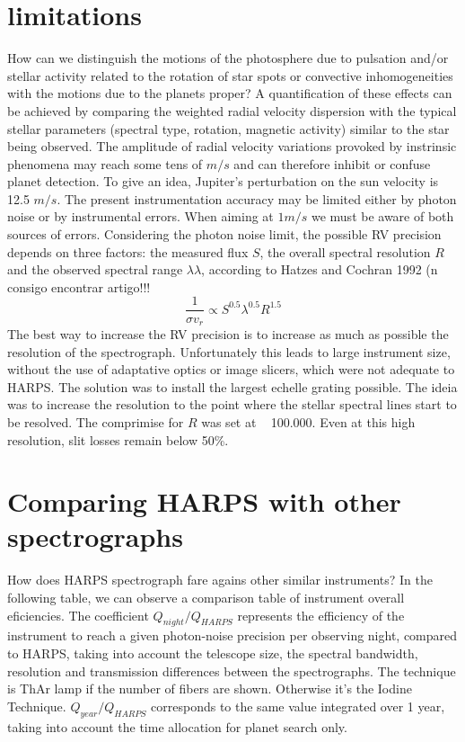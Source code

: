 \documentclass[dvips,12pt,a4paper]{report}
\begin{document}
{{\section{limitations}

How can we distinguish the motions of the photosphere due to pulsation and/or stellar activity related to the rotation of star spots or convective inhomogeneities with the motions due to the planets proper? A quantification of these effects can be achieved by comparing the weighted radial velocity dispersion with the typical stellar parameters (spectral type, rotation, magnetic activity) similar to the star being observed. The amplitude of radial velocity variations provoked by instrinsic phenomena may reach some tens of $m/s$ and can therefore inhibit or confuse planet detection. To give an idea, Jupiter's perturbation on the sun velocity is  ~ 12.5 $m/s$.
The present instrumentation accuracy may be limited either by photon noise or by instrumental errors. When aiming at $1m/s$ we must be aware of both sources of errors. 
Considering the photon noise limit, the possible RV precision depends on three factors: the measured flux $S$, the overall spectral resolution $R$ and the observed spectral range $\lambda\lambda$, according to Hatzes and Cochran 1992 (n consigo encontrar artigo!!! 
\begin{equation}
\frac{1}{\sigma v_r}\propto S^{0.5}\lambda^{0.5}R^{1.5}
\end{equation}
The best way to increase the RV precision is to increase as much as possible the resolution of the spectrograph. Unfortunately this leads to large instrument size, without the use of adaptative optics or image slicers, which were not adequate to HARPS. The solution was to install the largest echelle grating possible. The ideia was to increase the resolution to the point where the stellar spectral lines start to be resolved. The comprimise for $R$ was set at ~ 100.000. Even at this high resolution, slit losses remain below 50\%. 

\section{Comparing HARPS with other spectrographs}
How does HARPS spectrograph fare agains other similar instruments? In the following table, we can observe a comparison table of instrument overall eficiencies. The coefficient $Q_{night}/Q_{HARPS}$ represents the efficiency of the instrument to reach a given photon-noise precision per observing night, compared to HARPS, taking into account the telescope size, the spectral bandwidth, resolution and transmission differences between the spectrographs. The technique is ThAr lamp if the number of fibers are shown. Otherwise it's the Iodine Technique. $Q_{year}/Q_{HARPS}$ corresponds to the same value integrated over 1 year, taking into account the time allocation for planet search only. 

}}
\end{document}

